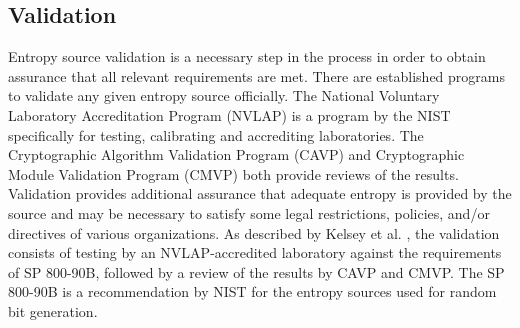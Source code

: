 \subsection{Validation}
Entropy source validation is a necessary step in the process in order to obtain assurance that all relevant requirements are met.
There are established programs to validate any given entropy source officially. 
The National Voluntary Laboratory Accreditation Program (NVLAP) is a program by the NIST specifically for testing, calibrating and accrediting laboratories.
The Cryptographic Algorithm Validation Program (CAVP) and Cryptographic Module Validation Program (CMVP) both provide reviews of the results\cite{entropy:cmvp}.
\newline
Validation provides additional assurance that adequate entropy is provided by the
source and may be necessary to satisfy some legal restrictions, policies, and/or directives of various
organizations.
\newline
As described by Kelsey et al. \cite{randomness:sources1}, the validation consists of testing by an NVLAP-accredited
laboratory against the requirements of SP 800-90B, followed by a review of the results by CAVP and CMVP.
The SP 800-90B is a recommendation by NIST for the entropy sources used for random bit generation\cite{entropy:validation}.

